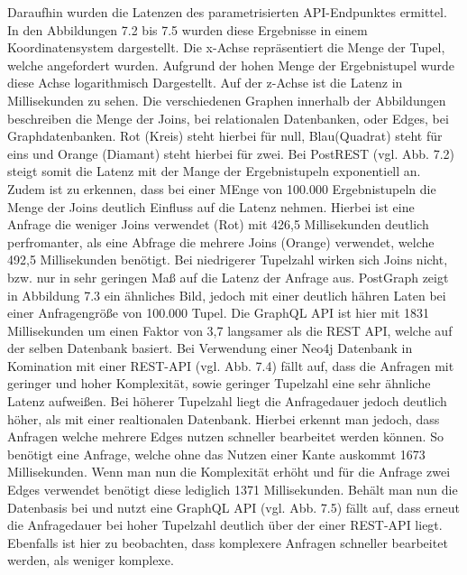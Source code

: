 \noindent
Daraufhin wurden die Latenzen des parametrisierten API-Endpunktes ermittel. In den Abbildungen 7.2 bis 7.5 wurden diese Ergebnisse in einem Koordinatensystem dargestellt. Die x-Achse repräsentiert die Menge der Tupel, welche angefordert wurden. Aufgrund der hohen Menge der Ergebnistupel wurde diese Achse logarithmisch Dargestellt. Auf der z-Achse ist die Latenz in Millisekunden zu sehen. Die verschiedenen Graphen innerhalb der Abbildungen beschreiben die Menge der Joins, bei relationalen Datenbanken, oder Edges, bei Graphdatenbanken. Rot (Kreis) steht hierbei für null, Blau(Quadrat) steht für eins und Orange (Diamant) steht hierbei für zwei. 
\newline
Bei PostREST (vgl. Abb. 7.2) steigt somit die Latenz mit der Mange der Ergebnistupeln exponentiell an. Zudem ist zu erkennen, dass bei einer MEnge von 100.000 Ergebnistupeln die Menge der Joins deutlich Einfluss auf die Latenz nehmen. Hierbei ist eine Anfrage die weniger Joins verwendet (Rot) mit 426,5 Millisekunden deutlich perfromanter, als eine Abfrage die mehrere Joins (Orange) verwendet, welche 492,5 Millisekunden benötigt. Bei niedrigerer Tupelzahl wirken sich Joins nicht, bzw. nur in sehr geringen Maß auf die Latenz der Anfrage aus.
\newline
PostGraph zeigt in Abbildung 7.3 ein ähnliches Bild, jedoch mit einer deutlich hähren Laten bei einer Anfragengröße von 100.000 Tupel. Die GraphQL API ist hier mit 1831 Millisekunden um einen Faktor von 3,7 langsamer als die REST API, welche auf der selben Datenbank basiert.
\newline
Bei Verwendung einer Neo4j Datenbank in Komination mit einer REST-API (vgl. Abb. 7.4) fällt auf, dass die Anfragen mit geringer und hoher Komplexität, sowie geringer Tupelzahl eine sehr ähnliche Latenz aufweißen. Bei höherer Tupelzahl liegt die Anfragedauer jedoch deutlich höher, als mit einer realtionalen Datenbank. Hierbei erkennt man jedoch, dass Anfragen welche mehrere Edges nutzen schneller bearbeitet werden können. So benötigt eine Anfrage, welche ohne das Nutzen einer Kante auskommt 1673 Millisekunden. Wenn man nun die Komplexität erhöht und für die Anfrage  zwei Edges verwendet benötigt diese lediglich 1371 Millisekunden.
 \newline
Behält man nun die Datenbasis bei und nutzt eine GraphQL API (vgl. Abb. 7.5) fällt auf, dass erneut die Anfragedauer bei hoher Tupelzahl deutlich über der einer REST-API liegt. Ebenfalls ist hier zu beobachten, dass komplexere Anfragen schneller bearbeitet werden, als weniger komplexe.
